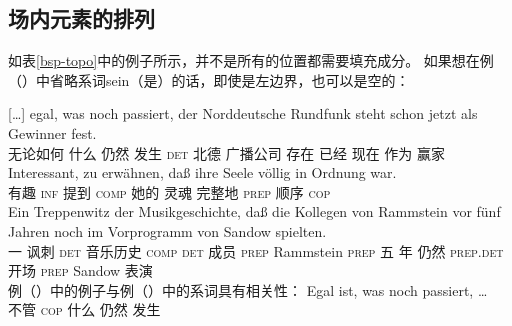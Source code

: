 \pagebreak
\subsection{场内元素的排列}

如表\ref{bsp-topo}中的例子所示，并不是所有的位置都需要填充成分。
如果想在例（）中省略系词sein（是）的话，即使是左边界，也可以是空的：
\eal
\ex

{}[\ldots]
\gll egal,      was  noch  passiert, der Norddeutsche Rundfunk             steht  schon   jetzt als Gewinner fest.\footnotemark\\
     无论如何 什么 仍然 发生 \textsc{det} 北德 广播公司 存在 已经 现在 作为 赢家 \particle\\
\ex 
\gll Interessant, zu erwähnen, daß ihre Seele völlig    in Ordnung war.\footnotemark\\
	 有趣 \textsc{inf} 提到 \textsc{comp} 她的 灵魂 完整地 \textsc{prep} 顺序 \textsc{cop}\\
\ex
\gll Ein Treppenwitz der    Musikgeschichte, daß die Kollegen   von Rammstein vor    fünf Jahren noch im      Vorprogramm   von Sandow spielten.\footnotemark\\
	 一 讽刺 \textsc{det} 音乐历史 \textsc{comp} \textsc{det} 成员 \textsc{prep} Rammstein \textsc{prep} 五 年 仍然 \textsc{prep}.\textsc{det} 开场 \textsc{prep} Sandow 表演\\
\zl
例（）中的例子与例（）中的系词具有相关性：
\eal
\ex 
\gll Egal ist, was noch passiert, \ldots\\
     不管 \textsc{cop}	 什么 仍然 发生 \\
